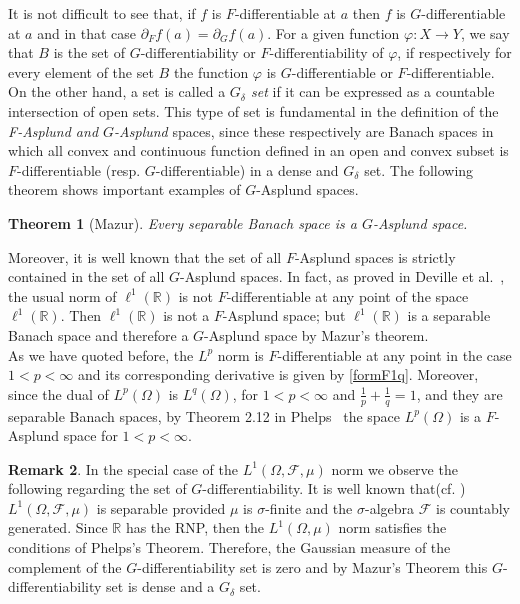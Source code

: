 \documentclass[a4paper,12pt,reqno]{amsart}%
\newcommand{\cal}{\mathcal}
\newtheorem{theorem}{Theorem}
\theoremstyle{definition}
\newtheorem{remark}[theorem]{Remark}
\numberwithin{equation}{section}
\numberwithin{theorem}{section}
\begin{document}
It is not difficult to see that, if $f$ is   $F$-differentiable at $a$ then $f$ is $G$-differentiable at $a$ and in that case $\partial_{F}f(a)=\partial_{G}f(a)$.  For a given  function $\varphi:X\rightarrow Y$, we say that $B$ is the set of $G$-differentiability or $F$-differentiability of $\varphi$, if respectively for every element of the set $B$ the function $\varphi$ is $G$-differentiable or $F$-differentiable.\\

On the other hand, a set is called a {\it $G_{\delta}$ set} if it can be expressed as a countable intersection of open sets. This type of set is fundamental in the definition of the {\it F-Asplund  and $G$-Asplund} spaces, since these respectively are Banach spaces in which all convex and continuous function defined in an open and convex subset is $F$-differentiable (resp. $G$-differentiable) in a dense and $G_{\delta}$ set. The following theorem shows  important examples of $G$-Asplund spaces.

\begin{theorem}[Mazur]\label{a4}
	Every separable Banach space is a $G$-Asplund space.
\end{theorem}

Moreover, it is well known that the set of all $F$-Asplund spaces is strictly contained in the set of all $G$-Asplund spaces. In fact, as proved in Deville et al.~\cite{de}, the usual norm of $\ell^{1}(\mathbb{R})$ is not $F$-differentiable at  any point of the space $\ell^{1}(\mathbb{R})$. Then $\ell^{1}(\mathbb{R})$ is not a $F$-Asplund space; but $\ell^{1}(\mathbb{R})$ is a separable Banach space and therefore a $G$-Asplund space by  Mazur's theorem.\\

As we have quoted before, the $L^p$ norm is $F$-differentiable at any point in the case  $1<p<\infty$ and its corresponding derivative is given by \eqref{formF1q}. 
 Moreover, since the dual of $L^{p}(\Omega)$ is $L^{q}(\Omega)$, for $1<p<\infty $ and $\frac{1}{p}+\frac{1}{q}=1$, and they are separable Banach spaces, by  Theorem 2.12 in Phelps~\cite{ph2} the space $L^{p}(\Omega)$ is a $F$-Asplund space for $1<p<\infty$.


\begin{remark} In the special case of the $L^{1}(\Omega,\cal{F}, \mu)$ norm we observe the following regarding  the set of $G$-differentiability. It is well known that(cf. \cite{cohn})  $L^1(\Omega,\cal{F}, \mu)$ is separable provided $\mu$ is $\sigma$-finite and the  $\sigma$-algebra $\cal{F}$ is countably generated. Since $\mathbb{R}$ has the RNP, then the $L^{1}(\Omega, \mu)$ norm satisfies the conditions of  Phelps's Theorem. Therefore, the Gaussian measure of the complement of the $G$-differentiability set is zero and  by Mazur's Theorem this $G$-differentiability set is dense and a $G_{\delta}$ set.	
\end{remark}	
\end{document}
